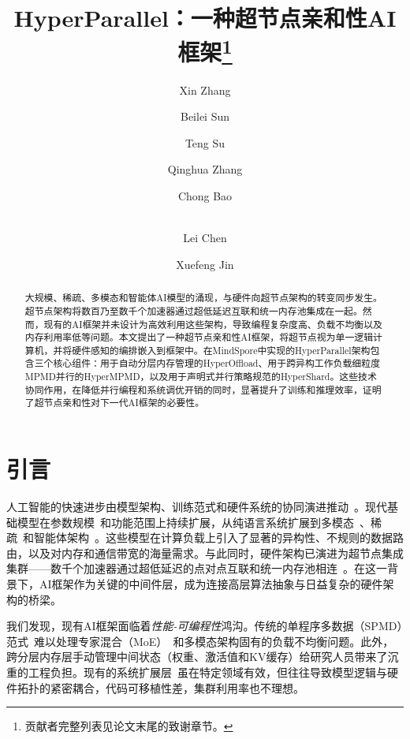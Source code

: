 \documentclass[11pt]{article}
\title{HyperParallel：一种超节点亲和性AI框架\footnote{贡献者完整列表见论文末尾的致谢章节。}}
\author[$\dagger$]{Xin Zhang}
\author[$\ddagger$]{Beilei Sun}
\author[$\ddagger$]{Teng Su}
\author[$\ddagger$]{Qinghua Zhang}
\author[$\ddagger$]{Chong Bao}
\author[$\dagger$]{\\Lei Chen}
\author[$\ddagger$]{Xuefeng Jin}
\affil[$\dagger$]{\textit{香港科技大学 \& 香港科技大学（广州），香港及广州，中国}}
\affil[$\ddagger$]{\textit{华为技术有限公司，中国}}
\date{}
\begin{document}
\maketitle

\thispagestyle{firstpage}

\begingroup
\renewcommand\thefootnote{*}
\endgroup

\begin{abstract}
大规模、稀疏、多模态和智能体AI模型的涌现，与硬件向超节点架构的转变同步发生。超节点架构将数百乃至数千个加速器通过超低延迟互联和统一内存池集成在一起。然而，现有的AI框架并未设计为高效利用这些架构，导致编程复杂度高、负载不均衡以及内存利用率低等问题。本文提出了一种超节点亲和性AI框架，将超节点视为单一逻辑计算机，并将硬件感知的编排嵌入到框架中。在MindSpore中实现的HyperParallel架构包含三个核心组件：用于自动分层内存管理的HyperOffload、用于跨异构工作负载细粒度MPMD并行的HyperMPMD，以及用于声明式并行策略规范的HyperShard。这些技术协同作用，在降低并行编程和系统调优开销的同时，显著提升了训练和推理效率，证明了超节点亲和性对下一代AI框架的必要性。
\end{abstract}

\section{引言}
人工智能的快速进步由模型架构、训练范式和硬件系统的协同演进推动~\cite{mudigere2022software,pandey2019machine, paszke2019pytorch}。现代基础模型在参数规模~\cite{fedus2022switch,hoffmann2022training,ren2023pangu}和功能范围上持续扩展，从纯语言系统扩展到多模态~\cite{sun2024generative}、稀疏~\cite{chen2022towards,dettmers2023spqr}和智能体架构~\cite{yu2025dapo}。这些模型在计算负载上引入了显著的异构性、不规则的数据路由，以及对内存和通信带宽的海量需求。与此同时，硬件架构已演进为超节点集成集群——数千个加速器通过超低延迟的点对点互联和统一内存池相连~\cite{li2023pond,ubmesh,matrix384}。在这一背景下，AI框架作为关键的中间件层，成为连接高层算法抽象与日益复杂的硬件架构的桥梁。

我们发现，现有AI框架面临着\textit{性能-可编程性}鸿沟。传统的单程序多数据（SPMD）范式~\cite{darema2001spmd}难以处理专家混合（MoE）~\cite{chen2022towards,dettmers2023spqr}和多模态架构固有的负载不均衡问题。此外，跨分层内存层手动管理中间状态（权重、激活值和KV缓存）给研究人员带来了沉重的工程负担。现有的系统扩展层~\cite{barham2022pathways,jax2018github,jiang2024megascale,jung2025hlx,rasley2020deepspeed,ren2021zero,shoeybi2019megatron}虽在特定领域有效，但往往导致模型逻辑与硬件拓扑的紧密耦合，代码可移植性差，集群利用率也不理想。
\end{document}
